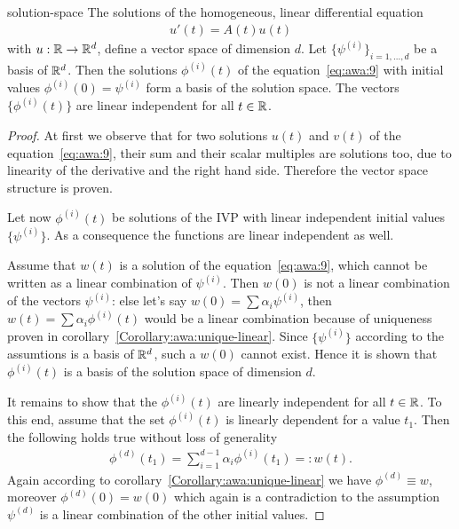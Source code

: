 \begin{Lemma}{solution-space}
  The solutions of the homogeneous, linear differential equation
  \begin{gather}
    \label{eq:awa:9}
    u'(t) = A(t) u(t)
  \end{gather}
  with $u:\mathbb R\to\mathbb R^d$, define a vector space of dimension $d$. Let
  $\{\psi^{(i)}\}_{i=1,\dots,d}$ be a basis of $\mathbb R^d$. 
	Then the solutions $\phi^{(i)}(t)$ of the equation~\eqref{eq:awa:9} with 
  initial values $\phi^{(i)}(0) = \psi^{(i)}$ form a basis of the solution
  space. The vectors $\{\phi^{(i)}(t)\}$ are linear independent
  for all $t\in \mathbb R$.
\end{Lemma}


\begin{proof}
  At first we observe that for two solutions $u(t)$ and $v(t)$ of the
  equation~\eqref{eq:awa:9}, their sum and their scalar multiples are
  solutions too, due to linearity  of the derivative
  and the right hand side.  Therefore the vector space structure is
  proven.
 
  Let now $\phi^{(i)}(t)$ be solutions of the IVP with linear
  independent initial values $\{\psi^{(i)}\}$.  As a consequence the
  functions are linear independent as well.

  Assume that $w(t)$ is a solution of the equation~\eqref{eq:awa:9},
  which cannot be written as a linear combination of $\psi^{(i)}$.
  Then $w(0)$ is not a linear combination of the vectors $\psi^{(i)}$:
  else let's say $w(0) = \sum \alpha_i \psi^{(i)}$, then
  $w(t) = \sum \alpha_i \phi^{(i)}(t)$ would be a linear combination
  because of uniqueness proven in
  corollary~\ref{Corollary:awa:unique-linear}.  Since $\{\psi^{(i)}\}$
  according to the assumtions is a basis of $\mathbb R^d$, such a $w(0)$
  cannot exist.  Hence it is shown that $\phi^{(i)}(t)$ is a basis of
  the solution space of dimension $d$.
  
  It remains to show that the $\phi^{(i)}(t)$ are linearly independent
  for all $t\in \mathbb R$. To this end, assume that the set $\phi^{(i)}(t)$
  is linearly dependent for a value $t_1$.  Then the following holds
  true without loss of generality
  \begin{gather*}
    \phi^{(d)}(t_1) = \sum_{i=1}^{d-1}\alpha_i\phi^{(i)}(t_1) =: w(t).
  \end{gather*}
  Again according to corollary~\ref{Corollary:awa:unique-linear} we
  have $\phi^{(d)} \equiv w$, moreover $\phi^{(d)}(0) = w(0)$ which
  again is a contradiction to the assumption $\psi^{(d)}$ is a linear
  combination of the other initial values.
\end{proof}

